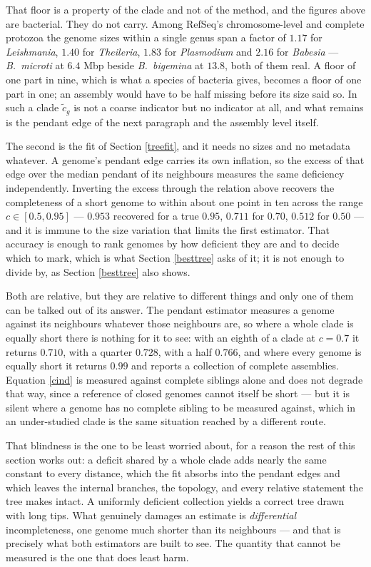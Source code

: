 \documentclass[pdflatex,sn-vancouver-num]{sn-jnl}
\begin{document}
That floor is a property of the clade and not of the method, and the figures above are bacterial. They
do not carry. Among RefSeq's chromosome-level and complete protozoa the genome sizes within a single
genus span a factor of $1.17$ for \emph{Leishmania}, $1.40$ for \emph{Theileria}, $1.83$ for
\emph{Plasmodium} and $2.16$ for \emph{Babesia} --- \emph{B.~microti} at $6.4$ Mbp beside
\emph{B.~bigemina} at $13.8$, both of them real. A floor of one part in nine, which is what a species
of bacteria gives, becomes a floor of one part in one; an assembly would have to be half missing before
its size said so. In such a clade $\tilde{c}_g$ is not a coarse indicator but no indicator at all, and
what remains is the pendant edge of the next paragraph and the assembly level itself.

The second is the fit of Section \ref{treefit}, and it needs no sizes and no metadata whatever. A
genome's pendant edge carries its own inflation, so the excess of that edge over the median pendant of
its neighbours measures the same deficiency independently. Inverting the excess through the relation
above recovers the completeness of a short genome to within about one point in ten across the range
$c \in [0.5, 0.95]$ --- $0.953$ recovered for a true $0.95$, $0.711$ for $0.70$, $0.512$ for $0.50$ ---
and it is immune to the size variation that limits the first estimator. That accuracy is enough to
rank genomes by how deficient they are and to decide which to mark, which is what
Section \ref{besttree} asks of it; it is not enough to divide by, as Section \ref{besttree} also
shows.

Both are relative, but they are relative to different things and only one of them can be talked out of
its answer. The pendant estimator measures a genome against its neighbours whatever those neighbours
are, so where a whole clade is equally short there is nothing for it to see: with an eighth of a clade
at $c = 0.7$ it returns $0.710$, with a quarter $0.728$, with a half $0.766$, and where every genome is
equally short it returns $0.99$ and reports a collection of complete assemblies. Equation \eqref{cind}
is measured against complete siblings alone and does not degrade that way, since a reference of closed
genomes cannot itself be short --- but it is silent where a genome has no complete sibling to be
measured against, which in an under-studied clade is the same situation reached by a different route.

That blindness is the one to be least worried about, for a reason the rest of this section works
out: a deficit shared by a whole clade adds nearly the same constant to every distance, which the fit
absorbs into the pendant edges and which leaves the internal branches, the topology, and every
relative statement the tree makes intact. A uniformly deficient collection yields a correct tree drawn
with long tips. What genuinely damages an estimate is \emph{differential} incompleteness, one genome
much shorter than its neighbours --- and that is precisely what both estimators are built to see. The
quantity that cannot be measured is the one that does least harm.
\end{document}
